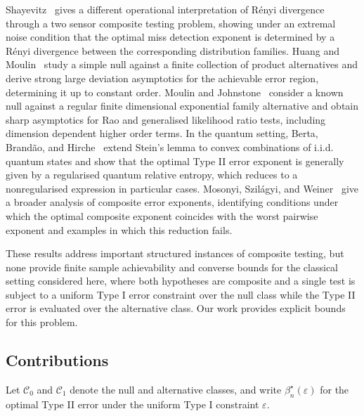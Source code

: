 \documentclass[journal,10pt,draftclsnofoot,onecolumn]{IEEEtran}
\begin{document}
Shayevitz~\cite{shayevitz2011renyi} gives a different operational interpretation of R\'enyi divergence through a two sensor composite testing problem, showing under an extremal noise condition that the optimal miss detection exponent is determined by a R\'enyi divergence between the corresponding distribution families. Huang and Moulin~\cite{huang2014strong} study a simple null against a finite collection of product alternatives and derive strong large deviation asymptotics for the achievable error region, determining it up to constant order. Moulin and Johnstone~\cite{moulin2015strong} consider a known null against a regular finite dimensional exponential family alternative and obtain sharp asymptotics for Rao and generalised likelihood ratio tests, including dimension dependent higher order terms. In the quantum setting, Berta, Brand\~ao, and Hirche~\cite{berta2021composite} extend Stein's lemma to convex combinations of i.i.d. quantum states and show that the optimal Type II error exponent is generally given by a regularised quantum relative entropy, which reduces to a nonregularised expression in particular cases. Mosonyi, Szil\'agyi, and Weiner~\cite{mosonyi2021error} give a broader analysis of composite error exponents, identifying conditions under which the optimal composite exponent coincides with the worst pairwise exponent and examples in which this reduction fails.

These results address important structured instances of composite testing, but none provide finite sample achievability and converse bounds for the classical setting considered here, where both hypotheses are composite and a single test is subject to a uniform Type I error constraint over the null class while the Type II error is evaluated over the alternative class. Our work provides explicit bounds for this problem.

\subsection{Contributions}
Let $\mathcal C_0$ and $\mathcal C_1$ denote the null and alternative classes, and write $\beta_n^\star(\varepsilon)$ for the optimal Type II error under the uniform Type I constraint $\varepsilon$.
\end{document}
